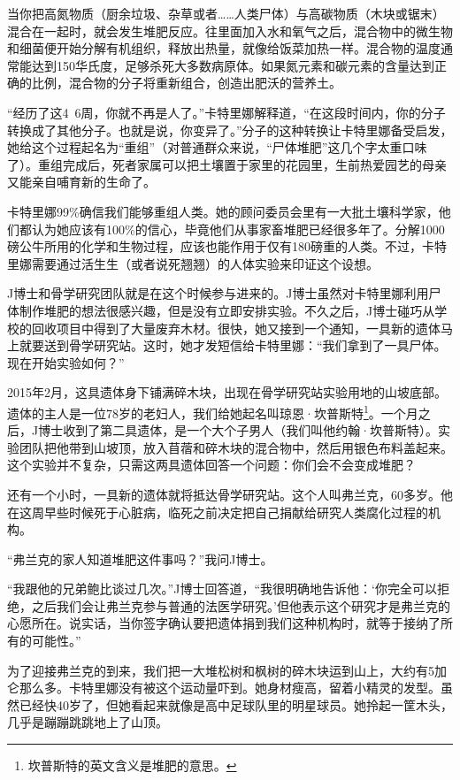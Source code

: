 \documentclass[12pt,oneside]{book}
\begin{document}
\begin{bookref}[frametitle={\cite{好好告别}}]
当你把高氮物质（厨余垃圾、杂草或者……人类尸体）与高碳物质（木块或锯末）混合在一起时，就会发生堆肥反应。往里面加入水和氧气之后，混合物中的微生物和细菌便开始分解有机组织，释放出热量，就像给饭菜加热一样。混合物的温度通常能达到150华氏度，足够杀死大多数病原体。如果氮元素和碳元素的含量达到正确的比例，混合物的分子将重新组合，创造出肥沃的营养土。

“经历了这4~6周，你就不再是人了。”卡特里娜解释道，“在这段时间内，你的分子转换成了其他分子。也就是说，你变异了。”分子的这种转换让卡特里娜备受启发，她给这个过程起名为“重组”（对普通群众来说，“尸体堆肥”这几个字太重口味了）。重组完成后，死者家属可以把土壤置于家里的花园里，生前热爱园艺的母亲又能亲自哺育新的生命了。

卡特里娜99\%确信我们能够重组人类。她的顾问委员会里有一大批土壤科学家，他们都认为她应该有100\%的信心，毕竟他们从事家畜堆肥已经很多年了。分解1000磅公牛所用的化学和生物过程，应该也能作用于仅有180磅重的人类。不过，卡特里娜需要通过活生生（或者说死翘翘）的人体实验来印证这个设想。

J博士和骨学研究团队就是在这个时候参与进来的。J博士虽然对卡特里娜利用尸体制作堆肥的想法很感兴趣，但是没有立即安排实验。不久之后，J博士碰巧从学校的回收项目中得到了大量废弃木材。很快，她又接到一个通知，一具新的遗体马上就要送到骨学研究站。这时，她才发短信给卡特里娜：“我们拿到了一具尸体。现在开始实验如何？”

2015年2月，这具遗体身下铺满碎木块，出现在骨学研究站实验用地的山坡底部。遗体的主人是一位78岁的老妇人，我们给她起名叫琼恩·坎普斯特\footnote{坎普斯特的英文含义是堆肥的意思。}。一个月之后，J博士收到了第二具遗体，是一个大个子男人（我们叫他约翰·坎普斯特）。实验团队把他带到山坡顶，放入苜蓿和碎木块的混合物中，然后用银色布料盖起来。这个实验并不复杂，只需这两具遗体回答一个问题：你们会不会变成堆肥？

还有一个小时，一具新的遗体就将抵达骨学研究站。这个人叫弗兰克，60多岁。他在这周早些时候死于心脏病，临死之前决定把自己捐献给研究人类腐化过程的机构。

“弗兰克的家人知道堆肥这件事吗？”我问J博士。

“我跟他的兄弟鲍比谈过几次。”J博士回答道，“我很明确地告诉他：‘你完全可以拒绝，之后我们会让弗兰克参与普通的法医学研究。’但他表示这个研究才是弗兰克的心愿所在。说实话，当你签字确认要把遗体捐到我们这种机构时，就等于接纳了所有的可能性。”

为了迎接弗兰克的到来，我们把一大堆松树和枫树的碎木块运到山上，大约有5加仑那么多。卡特里娜没有被这个运动量吓到。她身材瘦高，留着小精灵的发型。虽然已经快40岁了，但她看起来就像是高中足球队里的明星球员。她拎起一筐木头，几乎是蹦蹦跳跳地上了山顶。


\end{bookref}
\end{document}

